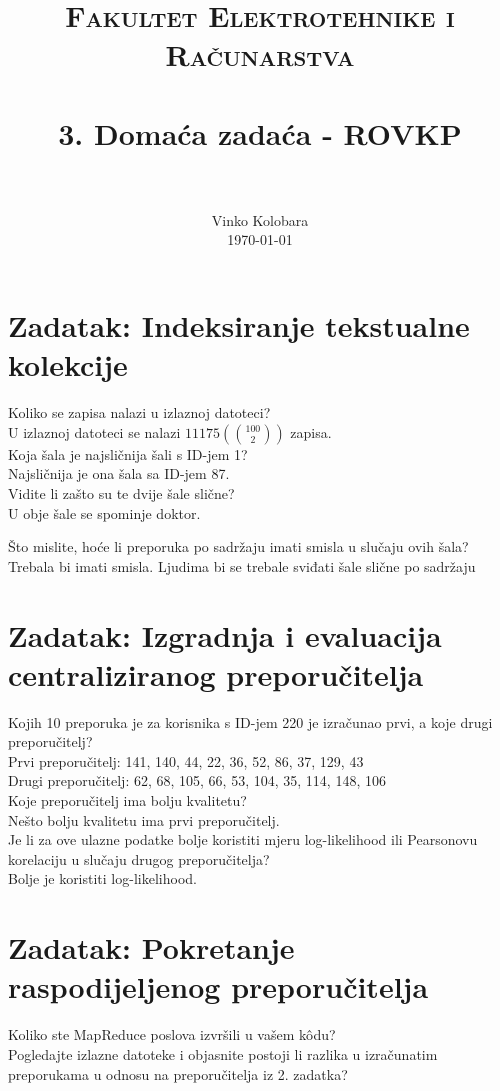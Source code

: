 \documentclass[paper=a4, fontsize=11pt]{scrartcl}
\title{
		\usefont{OT1}{bch}{b}{n}
		\normalfont \normalsize \textsc{Fakultet Elektrotehnike i Računarstva} \\ [25pt]
		\horrule{0.5pt} \\[0.4cm]
		\huge 3. Domaća zadaća - ROVKP \\
		\horrule{2pt} \\[0.5cm]
}
\author{
		\normalfont 								\normalsize
        Vinko Kolobara\\[-3pt]		\normalsize
        \today
}
\date{}
\numberwithin{equation}{section}		%
\numberwithin{figure}{section}			%
\numberwithin{table}{section}				%
\begin{document}
\maketitle

\section{Zadatak: Indeksiranje tekstualne kolekcije}
Koliko se zapisa nalazi u izlaznoj datoteci?\\
U izlaznoj datoteci se nalazi $11175 (100 \choose 2)$ zapisa.\\

Koja šala je najsličnija šali s ID-jem 1?\\
Najsličnija je ona šala sa ID-jem 87.\\

Vidite li zašto su te dvije šale slične?\\
U obje šale se spominje doktor.

Što mislite, hoće li preporuka po sadržaju imati smisla u slučaju ovih šala?\\
Trebala bi imati smisla. Ljudima bi se trebale sviđati šale slične po sadržaju\\


\pagebreak

\section{Zadatak: Izgradnja i evaluacija centraliziranog preporučitelja}
Kojih 10 preporuka je za korisnika s ID-jem 220 je izračunao prvi, a koje drugi preporučitelj?\\
Prvi preporučitelj: 141, 140, 44, 22, 36, 52, 86, 37, 129, 43\\
Drugi preporučitelj: 62, 68, 105, 66, 53, 104, 35, 114, 148, 106\\

Koje preporučitelj ima bolju kvalitetu?\\
Nešto bolju kvalitetu ima prvi preporučitelj.\\

Je li za ove ulazne podatke bolje koristiti mjeru log-likelihood ili Pearsonovu korelaciju u slučaju drugog preporučitelja?\\
Bolje je koristiti log-likelihood.

\pagebreak

\section{Zadatak: Pokretanje raspodijeljenog preporučitelja}
Koliko ste MapReduce poslova izvršili u vašem kôdu? \\


Pogledajte izlazne datoteke i objasnite postoji li razlika u izračunatim preporukama u odnosu na
preporučitelja iz 2. zadatka?\\
\end{document}
